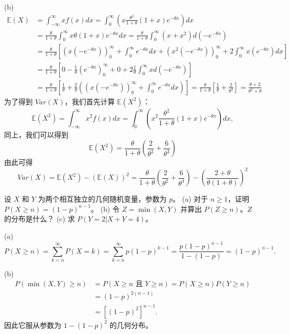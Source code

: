 \begin{questions}
\begin{solution}
(b) 
\begin{align*}
\mathbb{E}(X) &= \int_{-\infty}^{\infty} x f(x) dx = \int_{0}^{\infty} \left( x \frac{\theta^2}{1 + \theta}(1 + x)e^{-\theta x} \right) dx \\
&= \frac{\theta}{1 + \theta} \int_{0}^{\infty} x\theta(1 + x)e^{-\theta x} dx = \frac{\theta}{1 + \theta} \int_{0}^{\infty} (x + x^2) d(-e^{-\theta x}) \\
&= \frac{\theta}{1 + \theta} \left[ \left( x(-e^{-\theta x}) \right)_{0}^{\infty} + \int_{0}^{\infty} e^{-\theta x} dx + \left( x^2(-e^{-\theta x}) \right)_{0}^{\infty} + 2 \int_{0}^{\infty} x(e^{-\theta x}) dx \right] \\
&= \frac{\theta}{1 + \theta} \left[ 0 - \frac{1}{\theta} \left( e^{-\theta x} \right)_{0}^{\infty} + 0 + 2 \frac{1}{\theta} \int_{0}^{\infty} x d(-e^{-\theta x}) \right] \\
&= \frac{\theta}{1 + \theta} \left[ \frac{1}{\theta} + \frac{2}{\theta} \left( \left( x(-e^{-\theta x}) \right)_{0}^{\infty} + \int_{0}^{\infty} e^{-\theta x} dx \right) \right] = \frac{\theta}{1 + \theta} \left[ \frac{1}{\theta} + \frac{2}{\theta^2} \right] = \frac{\theta + 2}{\theta^2 + \theta}
\end{align*}
为了得到 $Var(X)$，我们首先计算 $\mathbb{E}(X^2)$：
\[
\mathbb{E}(X^2) = \int_{-\infty}^{\infty} x^2 f(x) dx = \int_{0}^{\infty} \left( x^2 \frac{\theta^2}{1 + \theta}(1 + x)e^{-\theta x} \right) dx,
\]
同上，我们可以得到
\[
\mathbb{E}(X^2) = \frac{\theta}{1 + \theta} \left( \frac{2}{\theta^2} + \frac{6}{\theta^3} \right)
\]
由此可得
\[
Var(X) = \mathbb{E}(X^2) - (\mathbb{E}(X))^2 = \frac{\theta}{1 + \theta} \left( \frac{2}{\theta^2} + \frac{6}{\theta^3} \right) - \left( \frac{2 + \theta}{\theta(1 + \theta)} \right)^2
\]
\end{solution}

    \question
设 $X$ 和 $Y$ 为两个相互独立的几何随机变量，参数为 $p$。
(a) 对于 $n \ge 1$，证明 $P(X \ge n) = (1 - p)^{n-1}$。
(b) 令 $Z = \min(X, Y)$ 并算出 $P(Z \ge n)$。$Z$ 的分布是什么？
(c) 求 $P(Y = 2 | X + Y = 4)$。

\begin{solution}
(a) 
\[
P(X \ge n) = \sum_{k=n}^{\infty} P(X = k) = \sum_{k=n}^{\infty} p(1 - p)^{k-1} = \frac{p(1 - p)^{n-1}}{1 - (1 - p)} = (1 - p)^{n-1}.
\]

(b) 
\begin{align*}
P(\min(X, Y) \ge n) &= P(X \ge n \text{ 且 } Y \ge n) = P(X \ge n)P(Y \ge n) \\
&= (1 - p)^{2(n-1)} \\
&= [(1 - p)^2]^{n-1}.
\end{align*}
因此它服从参数为 $1 - (1 - p)^2$ 的几何分布。


\end{solution}
\end{questions}
